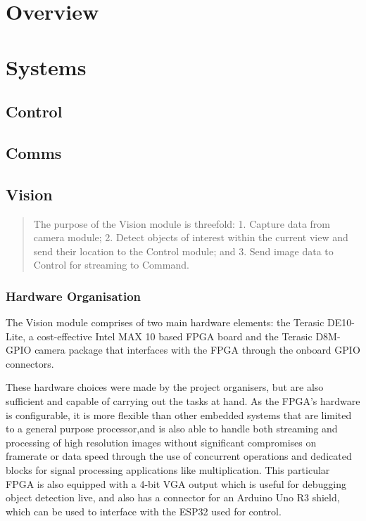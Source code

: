 \documentclass[a4paper]{article}
\begin{document}
\section{Overview}

\section{Systems}

\subsection{Control}
\subsection{Comms}

\subsection{Vision}
\begin{abstract}
    The purpose of the Vision module is threefold:
    1. Capture data from camera module;
    2. Detect objects of interest within the current view and 
        send their location to the Control module; and
    3. Send image data to Control for streaming to Command. 
\end{abstract}

\subsubsection{Hardware Organisation}

The Vision module comprises of two main hardware elements: 
    the Terasic DE10-Lite, a cost-effective Intel MAX 10 based FPGA board 
    \cite{TerasicDE10Web} 
    and the Terasic D8M-GPIO camera package \cite{TerasicD8MWeb}
that interfaces with the FPGA through the onboard GPIO connectors. 

These hardware choices were made by the project organisers, 
but are also sufficient and capable of carrying out the tasks at hand. 
As the FPGA's hardware is configurable, 
it is more flexible than other embedded systems 
that are limited to a general purpose processor,and 
is also able to handle both streaming and processing of high resolution images
without significant compromises on framerate or data speed 
through the use of concurrent operations and dedicated blocks 
for signal processing applications like multiplication.
This particular FPGA is also equipped with a 4-bit VGA output 
which is useful for debugging object detection live, 
and also has a connector for an Arduino Uno R3 shield, \cite{TerasicDE10Web} 
which can be used to interface with the ESP32 used for control.  
\end{document}
